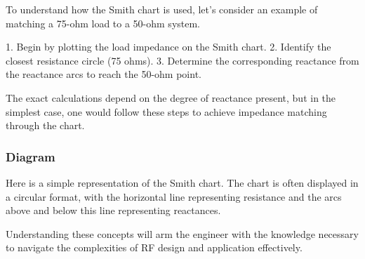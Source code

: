 To understand how the Smith chart is used, let's consider an example of matching a 75-ohm load to a 50-ohm system. 

1. Begin by plotting the load impedance on the Smith chart.
2. Identify the closest resistance circle (75 ohms).
3. Determine the corresponding reactance from the reactance arcs to reach the 50-ohm point. 

The exact calculations depend on the degree of reactance present, but in the simplest case, one would follow these steps to achieve impedance matching through the chart.

\subsubsection{Diagram}

Here is a simple representation of the Smith chart. The chart is often displayed in a circular format, with the horizontal line representing resistance and the arcs above and below this line representing reactances.


Understanding these concepts will arm the engineer with the knowledge necessary to navigate the complexities of RF design and application effectively.
